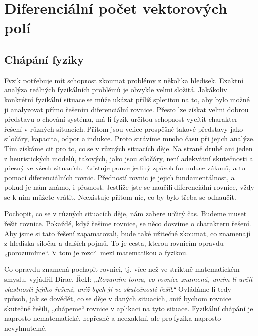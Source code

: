\setchaptertoc
\chapter{Diferenciální počet vektorových polí}\label{fyz:IIchapII}


  \section{Chápání fyziky}
    Fyzik potřebuje mít schopnost zkoumat problémy z několika hledisek. Exaktní analýza reálných
    fyzikálních problémů je obvykle velmi složitá. Jakákoliv konkrétní fyzikální situace se může
    ukázat příliš spletitou na to, aby bylo možné ji analyzovat přímo řešením diferenciální rovnice.
    Přesto lze získat velmi dobrou představu o chování systému, má-li fyzik určitou schopnost
    vycítit charakter řešení v různých situacích. Přitom jsou velice prospěšné takové představy jako
    siločáry, kapacita, odpor a indukce. Proto strávíme mnoho času při jejich analýze. Tím získáme
    cit pro to, co se v různých situacích děje. Na straně druhé ani jeden z heuristických modelů,
    takových, jako jsou siločáry, není adekvátní skutečnosti a přesný ve všech situacích. Existuje
    pouze jediný způsob formulace zákonů, a to pomocí diferenciálních rovnic. Předností rovnic je
    jejich fundamentálnost, a pokud je nám známo, i přesnost. Jestliže jste se naučili diferenciální
    rovnice, vždy se k nim můžete vrátit. Neexistuje přitom nic, co by bylo třeba se odnaučit.
    
    Pochopit, co se v různých situacích děje, nám zabere určitý čas. Budeme muset řešit rovnice. 
    Pokaždé, když řešíme rovnice, se něco dozvíme o charakteru řešení. Aby jsme si tato řešení 
    zapamatovali, bude také užitečné zkoumat, co znamenají z hlediska siločar a dalších pojmů. To 
    je cesta, kterou rovnicím opravdu „porozumíme“. V tom je rozdíl mezi matematikou a fyzikou. 
    
    Co opravdu znamená pochopit rovnici, tj. více než ve stri\-ktně matematickém smyslu, vyjádřil 
    Dirac. Řekl: \emph{„Rozumím tomu, co rovnice znamená, umím-li určit vlastnosti jejího řešení, 
    aniž bych ji ve skutečnosti řešil.“} Ovládáme-li tedy způsob, jak se dovědět, co se děje v 
    daných  situacích, aniž bychom rovnice skutečně řešili, „chápeme“ rovnice v aplikaci na tyto 
    situace. Fyzikální chápání je naprosto nematematické, nepřesné a neexaktní, ale pro fyzika 
    naprosto nevyhnutelné.
    

